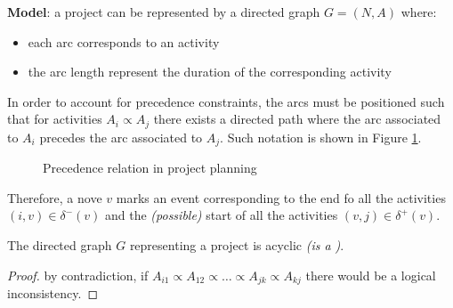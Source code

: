 \documentclass[english]{article}
\begin{document}
\textbf{Model}:
a project can be represented by a directed graph \(G = (N, A)\) where:

\begin{itemize}
  \item each arc corresponds to an activity
  \item the arc length represent the duration of the corresponding activity
\end{itemize}

In order to account for precedence constraints, the arcs must be positioned such that for activities \(A_i \propto A_j\) there exists a directed path where the arc associated to \(A_i\) precedes the arc associated to \(A_j\).
Such notation is shown in Figure \ref{fig:precedence-relation-in-project-planning}.

\begin{figure}[htbp]
  \centering
  \bigskip
  \bigskip
  \caption{Precedence relation in project planning}
  \label{fig:precedence-relation-in-project-planning}
\end{figure}

Therefore, a nove \(v\) marks an event corresponding to the end fo all the activities \(\left( i, v \right) \in \delta^-(v)\) and the \textit{(possible)} start of all the activities \(\left( v, j \right) \in \delta^+(v)\).

\bigskip

\begin{property}
  The directed graph \(G\) representing a project is acyclic \textit{(is a \DAG)}.
\end{property}

\begin{proof}
  by contradiction, if \(A_{i1} \propto A_{12} \propto \ldots \propto A_{jk} \propto A_{kj}\) there would be a logical inconsistency.
\end{proof}
\end{document}
